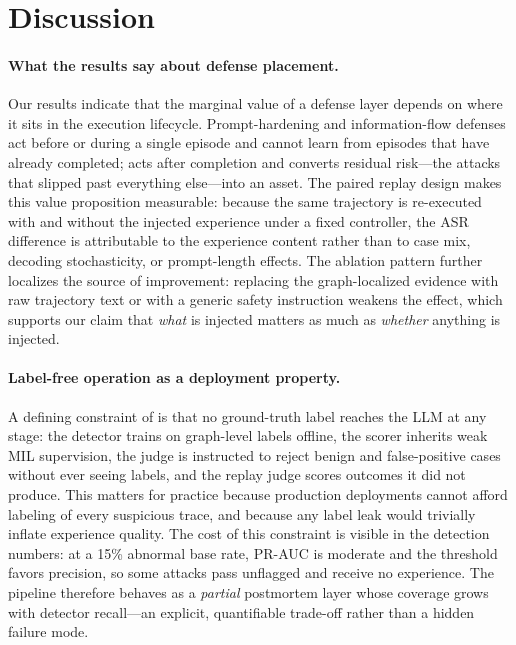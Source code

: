\section{Discussion}
\label{sec:discussion}

\paragraph{What the results say about defense placement.}
Our results indicate that the marginal value of a defense layer depends on where it sits in the execution lifecycle. Prompt-hardening and information-flow defenses act before or during a single episode and cannot learn from episodes that have already completed; \method{} acts after completion and converts residual risk---the attacks that slipped past everything else---into an asset. The paired replay design makes this value proposition measurable: because the same trajectory is re-executed with and without the injected experience under a fixed controller, the ASR difference is attributable to the experience content rather than to case mix, decoding stochasticity, or prompt-length effects. The ablation pattern further localizes the source of improvement: replacing the graph-localized evidence with raw trajectory text or with a generic safety instruction weakens the effect, which supports our claim that \emph{what} is injected matters as much as \emph{whether} anything is injected.

\paragraph{Label-free operation as a deployment property.}
A defining constraint of \method{} is that no ground-truth label reaches the LLM at any stage: the detector trains on graph-level labels offline, the scorer inherits weak MIL supervision, the judge is instructed to reject benign and false-positive cases without ever seeing labels, and the replay judge scores outcomes it did not produce. This matters for practice because production deployments cannot afford labeling of every suspicious trace, and because any label leak would trivially inflate experience quality. The cost of this constraint is visible in the detection numbers: at a 15\% abnormal base rate, PR-AUC is moderate and the threshold favors precision, so some attacks pass unflagged and receive no experience. The pipeline therefore behaves as a \emph{partial} postmortem layer whose coverage grows with detector recall---an explicit, quantifiable trade-off rather than a hidden failure mode.

